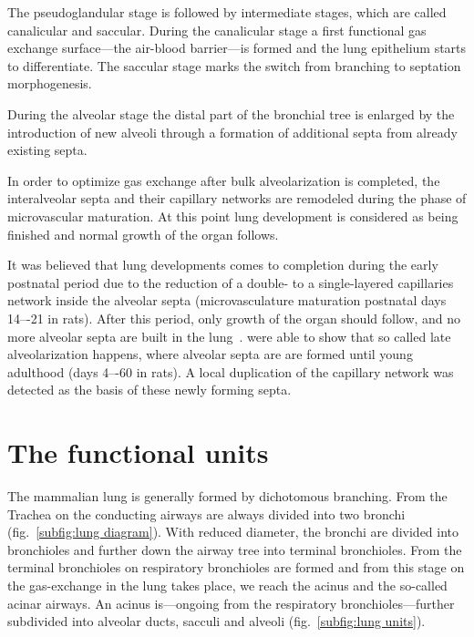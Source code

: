The pseudoglandular stage is followed by intermediate stages, which are called canalicular and saccular. During the canalicular stage a first functional gas exchange surface---the air-blood barrier---is formed and the lung epithelium starts to differentiate. The saccular stage marks the switch from branching to septation morphogenesis.

During the alveolar stage the distal part of the bronchial tree is enlarged by the introduction of new alveoli through a formation of additional septa from already existing septa. 

In order to optimize gas exchange after bulk alveolarization is completed, the interalveolar septa and their capillary networks are remodeled during the phase of microvascular maturation. At this point lung development is considered as being finished and normal growth of the organ follows.

It was believed that lung developments comes to completion during the early postnatal period due to the reduction of a double- to a single-layered capillaries network inside the alveolar septa (microvasculature maturation postnatal days 14–-21 in rats). After this period, only growth of the organ should follow, and no more alveolar septa are built in the lung~\cite{Burri1999,Schittny2004}. \citet{Schittny2008} were able to show that so called late alveolarization happens, where alveolar septa are are formed until young adulthood (days 4–-60 in rats). A local duplication of the capillary network was detected as the basis of these newly forming septa.

\section{The functional units}
The mammalian lung is generally formed by dichotomous branching. From the Trachea on the conducting airways are always divided into two bronchi (fig.~\ref{subfig:lung diagram}). With reduced diameter, the bronchi are divided into bronchioles and further down the airway tree into terminal bronchioles. From the terminal bronchioles on respiratory bronchioles are formed and from this stage on the gas-exchange in the lung takes place, we reach the acinus and the so-called acinar airways. An acinus is---ongoing from the respiratory bronchioles---further subdivided into alveolar ducts, sacculi and alveoli (fig.~\ref{subfig:lung units}).

